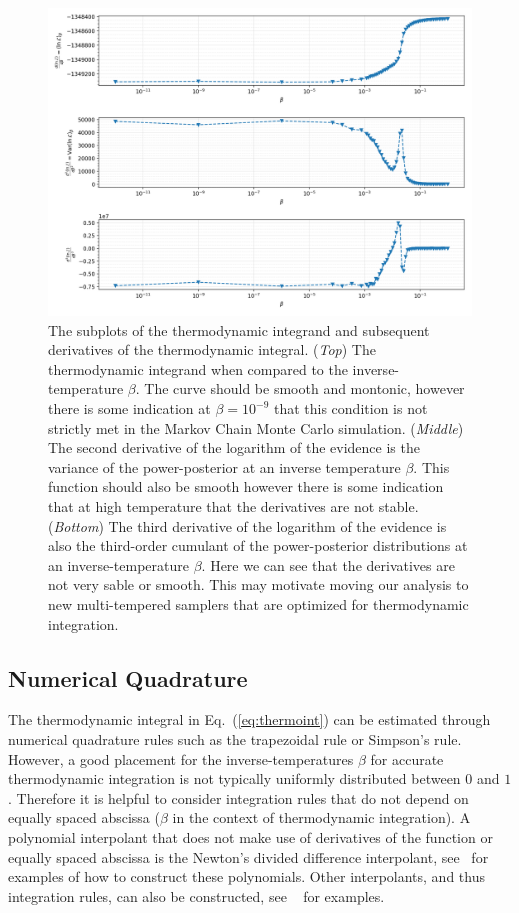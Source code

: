\begin{figure}[th]
\centering
\includegraphics[width=1.0\textwidth]{figs/chapter6/gooseneck_plots_log.png}
\caption{The subplots of the thermodynamic integrand and subsequent derivatives of the thermodynamic integral. (\textit{Top}) The thermodynamic integrand when compared to the inverse-temperature $\beta$. The curve should be smooth and montonic, however there is some indication at $\beta = 10^{-9}$ that this condition is not strictly met in the Markov Chain Monte Carlo simulation. (\textit{Middle}) The second derivative of the logarithm of the evidence is the variance of the power-posterior at an inverse temperature $\beta$. This function should also be smooth however there is some indication that at high temperature that the derivatives are not stable. (\textit{Bottom}) The third derivative of the logarithm of the evidence is also the third-order cumulant of the power-posterior distributions at an inverse-temperature $\beta$. Here we can see that the derivatives are not very sable or smooth. This may motivate moving our analysis to new multi-tempered samplers that are optimized for thermodynamic integration.}
\label{fig:gooseneck_log}
\end{figure}

\subsection{Numerical Quadrature}
The thermodynamic integral in Eq.~(\ref{eq:thermoint}) can be estimated through numerical quadrature rules such as the trapezoidal rule or Simpson's rule. However, a good placement for the inverse-temperatures $\beta$ for accurate thermodynamic integration is not typically uniformly distributed between $0$ and $1$. Therefore it is helpful to consider integration rules that do not depend on equally spaced abscissa ($\beta$ in the context of thermodynamic integration). A polynomial interpolant that does not make use of derivatives of the function or equally spaced abscissa is the Newton's divided difference interpolant, see~\cite{brun1953generalization, selmer1958numerical, abramowitz1965handbook} for examples of how to construct these polynomials. Other interpolants, and thus integration rules, can also be constructed, see ~\cite{abramowitz1965handbook} for examples.

